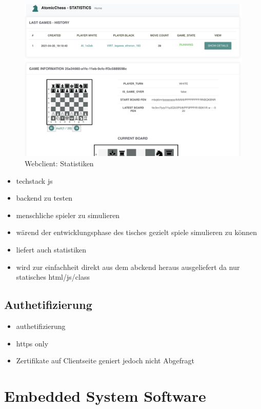 \begin{figure}
\centering
\includegraphics{images/ATC_statistics.png}
\caption{Webclient: Statistiken}
\end{figure}

\begin{itemize}
\tightlist
\item
  techstack js
\item
  backend zu testen
\item
  menschliche spieler zu simulieren
\item
  wärend der entwicklungsphase des tisches gezielt spiele simulieren zu
  können
\item
  liefert auch statistiken
\item
  wird zur einfachheit direkt aus dem abckend heraus ausgeliefert da nur
  statisches html/js/class
\end{itemize}

\hypertarget{authetifizierung}{%
\subsection{Authetifizierung}\label{authetifizierung}}

\begin{itemize}
\tightlist
\item
  authetifizierung
\item
  https only
\item
  Zertifikate auf Clientseite geniert jedoch nicht Abgefragt
\end{itemize}

\hypertarget{embedded-system-software}{%
\section{Embedded System Software}\label{embedded-system-software}}

